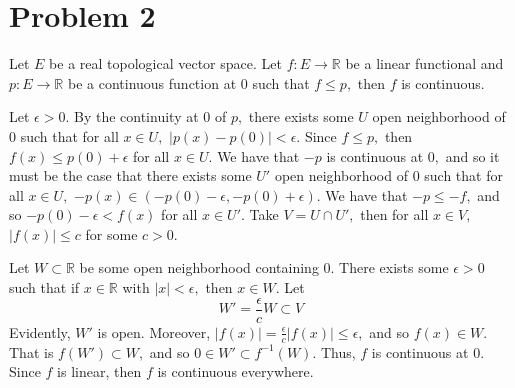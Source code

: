 \documentclass[11pt]{article}
\newcommand{\bbR}{\mathbb{R}}
\begin{document}
\newpage
\section*{Problem 2}
\begin{problem}
    Let $E$ be a real topological vector space. Let $f: E\to \bbR$ be a linear functional and $p: E\to \bbR$ be a continuous function at $0$ such that $f\leq p,$ then $f$ is continuous. 
\end{problem}
\begin{solution}
Let $\epsilon>0.$ 
By the continuity at $0$ of $p,$ there exists some $U$  open neighborhood of $0$ such that for all $x\in U,$ $|p(x) - p(0)|< \epsilon.$ Since $f\leq p,$ then $f(x) \leq p(0) + \epsilon$ for all $x\in U.$ We have that $-p$ is continuous at $0,$ and so it must be the case that there exists some $U'$ open neighborhood of $0$ such that for all $x\in U,$ 
$-p(x)\in (-p(0)- \epsilon, -p(0) + \epsilon).$ We have that $-p \leq -f,$ and so $-p(0) - \epsilon < f(x)$ for all $x\in U'.$ Take $V = U \cap U',$ then for all $x\in V,$ $|f(x)|\leq c$ for some $c>0.$

Let $W\subset \bbR$ be some open neighborhood containing $0.$ There exists some $\epsilon>0$ such that if $x\in \bbR$ with $|x|< \epsilon,$ then $x\in W.$ Let 
\[W' = \frac{\epsilon}{c}W\subset V\] Evidently, $W'$ is open. Moreover, $|f(x)| = \frac{\epsilon}{c}|f(x)|\leq \epsilon,$ and so $f(x)\in W.$ That is $f(W')\subset W,$ and so $0 \in W' \subset f^{-1}(W).$ Thus, $f$ is continuous at $0.$ Since $f$ is linear, then $f$ is continuous everywhere. 
\end{solution}

\newpage
\end{document}
